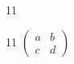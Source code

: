 \documentclass[paper=A4]{ropas-poster}
\begin{document}
\begin{postergrid}{1}{1}
\begin{posterblock}{1}{1}
$\begin{pmatrix}a&b\\c&d\end{pmatrix}$
\end{posterblock}
\end{postergrid}
\end{document}
